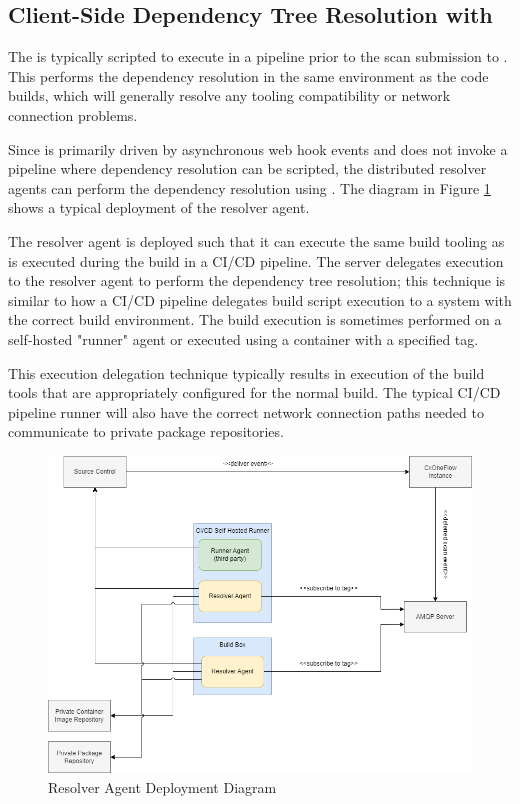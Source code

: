 \subsection{Client-Side Dependency Tree Resolution with \scaresolver}

The \scaresolver is typically scripted to execute in
a pipeline prior to the scan submission to \cxone.  This performs the dependency resolution
in the same environment as the code builds, which will generally resolve any tooling compatibility or network connection
problems.  

Since \cxoneflow is primarily driven by asynchronous web hook events and does not invoke a pipeline
where dependency resolution can be scripted, the distributed resolver agents can perform the dependency resolution using
\scaresolver. The diagram in Figure \ref{fig:resolver-agent-diagram} shows a typical deployment of the resolver agent.  


The resolver agent is deployed such that it can execute the same build tooling as is executed during the build
in a CI/CD pipeline. The \cxoneflow server delegates \scaresolver execution to the resolver agent to perform the dependency tree
resolution; this technique is similar to how a CI/CD pipeline delegates build script execution to a system with the correct
build environment.  The build execution is sometimes performed on a self-hosted "runner" agent or executed using a container with a specified tag. 

This execution delegation technique typically results in execution of the build tools that are appropriately
configured for the normal build.  The typical CI/CD pipeline runner will also have the correct network connection paths
needed to communicate to private package repositories.


\begin{figure}[ht]
  \includegraphics[width=\textwidth]{graphics/cxoneflow-diagrams-Resolver Agent Diagram.png}
  \caption{Resolver Agent Deployment Diagram}
  \label{fig:resolver-agent-diagram}
\end{figure}






